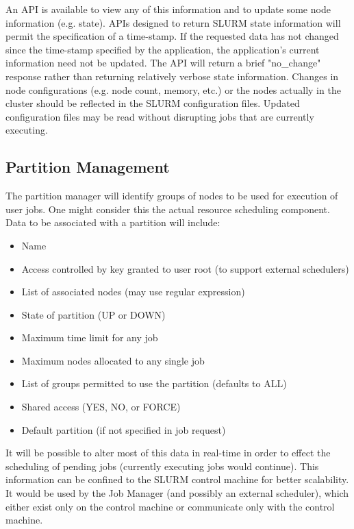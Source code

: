 An API is available to view any of this information and to update some 
node information (e.g. state). APIs designed to return SLURM
state information will permit the specification of a time-stamp.  If the
requested data has not changed since the time-stamp specified by the
application, the application's current information need not be updated.
The API will return a brief "no\_change" response rather than returning
relatively verbose state information.
Changes in node configurations (e.g. node count, memory, etc.) or the nodes 
actually in the cluster should be reflected in the SLURM configuration 
files. Updated configuration files may be read without disrupting jobs 
that are currently executing.

\subsection{Partition Management}

The partition manager will identify groups of nodes to be used for
execution of user jobs. One might consider this the actual resource 
scheduling component. 
Data to be associated with a partition will include:
\begin{itemize}
\item Name
\item Access controlled by key granted to user root (to support external schedulers)
\item List of associated nodes (may use regular expression)
\item State of partition (UP or DOWN)
\item Maximum time limit for any job
\item Maximum nodes allocated to any single job
\item List of groups permitted to use the partition (defaults to ALL)
\item Shared access (YES, NO, or FORCE)
\item Default partition (if not specified in job request)
\end{itemize}

It will be possible to alter most of this data in real-time in order
to effect the scheduling of pending jobs (currently executing jobs
would continue).  This information can be confined to the SLURM control
machine for better scalability.  It would be used by the Job Manager
(and possibly an external scheduler), which either exist only on the
control machine or communicate only with the control machine. 

